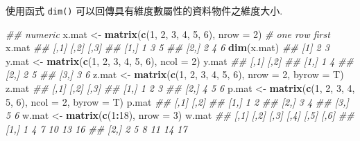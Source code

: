 \documentclass[
]{book}
\newenvironment{Shaded}{\begin{snugshade}}{\end{snugshade}}
\newcommand{\CommentTok}[1]{\textcolor[rgb]{0.56,0.35,0.01}{\textit{#1}}}
\newcommand{\DataTypeTok}[1]{\textcolor[rgb]{0.13,0.29,0.53}{#1}}
\newcommand{\DecValTok}[1]{\textcolor[rgb]{0.00,0.00,0.81}{#1}}
\newcommand{\KeywordTok}[1]{\textcolor[rgb]{0.13,0.29,0.53}{\textbf{#1}}}
\newcommand{\NormalTok}[1]{#1}
\newcommand{\OperatorTok}[1]{\textcolor[rgb]{0.81,0.36,0.00}{\textbf{#1}}}
\newcommand{\StringTok}[1]{\textcolor[rgb]{0.31,0.60,0.02}{#1}}
\begin{document}
使用函式
\texttt{dim()}
可以回傳具有維度數屬性的資料物件之維度大小.

\begin{Shaded}
\begin{Highlighting}[]
\CommentTok{\#\# numeric}
\NormalTok{x.mat \textless{}{-}}\StringTok{ }\KeywordTok{matrix}\NormalTok{(}\KeywordTok{c}\NormalTok{(}\DecValTok{1}\NormalTok{, }\DecValTok{2}\NormalTok{, }\DecValTok{3}\NormalTok{, }\DecValTok{4}\NormalTok{, }\DecValTok{5}\NormalTok{, }\DecValTok{6}\NormalTok{), }\DataTypeTok{nrow =} \DecValTok{2}\NormalTok{) }\CommentTok{\# one row first}
\NormalTok{x.mat}
\CommentTok{\#\#      [,1] [,2] [,3]}
\CommentTok{\#\# [1,]    1    3    5}
\CommentTok{\#\# [2,]    2    4    6}
\KeywordTok{dim}\NormalTok{(x.mat)}
\CommentTok{\#\# [1] 2 3}
\NormalTok{y.mat \textless{}{-}}\StringTok{ }\KeywordTok{matrix}\NormalTok{(}\KeywordTok{c}\NormalTok{(}\DecValTok{1}\NormalTok{, }\DecValTok{2}\NormalTok{, }\DecValTok{3}\NormalTok{, }\DecValTok{4}\NormalTok{, }\DecValTok{5}\NormalTok{, }\DecValTok{6}\NormalTok{), }\DataTypeTok{ncol =} \DecValTok{2}\NormalTok{)}
\NormalTok{y.mat}
\CommentTok{\#\#      [,1] [,2]}
\CommentTok{\#\# [1,]    1    4}
\CommentTok{\#\# [2,]    2    5}
\CommentTok{\#\# [3,]    3    6}
\NormalTok{z.mat \textless{}{-}}\StringTok{ }\KeywordTok{matrix}\NormalTok{(}\KeywordTok{c}\NormalTok{(}\DecValTok{1}\NormalTok{, }\DecValTok{2}\NormalTok{, }\DecValTok{3}\NormalTok{, }\DecValTok{4}\NormalTok{, }\DecValTok{5}\NormalTok{, }\DecValTok{6}\NormalTok{), }\DataTypeTok{nrow =} \DecValTok{2}\NormalTok{, }\DataTypeTok{byrow =}\NormalTok{ T)}
\NormalTok{z.mat}
\CommentTok{\#\#      [,1] [,2] [,3]}
\CommentTok{\#\# [1,]    1    2    3}
\CommentTok{\#\# [2,]    4    5    6}
\NormalTok{p.mat \textless{}{-}}\StringTok{ }\KeywordTok{matrix}\NormalTok{(}\KeywordTok{c}\NormalTok{(}\DecValTok{1}\NormalTok{, }\DecValTok{2}\NormalTok{, }\DecValTok{3}\NormalTok{, }\DecValTok{4}\NormalTok{, }\DecValTok{5}\NormalTok{, }\DecValTok{6}\NormalTok{), }\DataTypeTok{ncol =} \DecValTok{2}\NormalTok{, }\DataTypeTok{byrow =}\NormalTok{ T)}
\NormalTok{p.mat}
\CommentTok{\#\#      [,1] [,2]}
\CommentTok{\#\# [1,]    1    2}
\CommentTok{\#\# [2,]    3    4}
\CommentTok{\#\# [3,]    5    6}
\NormalTok{w.mat \textless{}{-}}\StringTok{ }\KeywordTok{matrix}\NormalTok{(}\KeywordTok{c}\NormalTok{(}\DecValTok{1}\OperatorTok{:}\DecValTok{18}\NormalTok{), }\DataTypeTok{nrow =} \DecValTok{3}\NormalTok{)}
\NormalTok{w.mat}
\CommentTok{\#\#      [,1] [,2] [,3] [,4] [,5] [,6]}
\CommentTok{\#\# [1,]    1    4    7   10   13   16}
\CommentTok{\#\# [2,]    2    5    8   11   14   17}

\end{Highlighting}
\end{Shaded}
\end{document}
